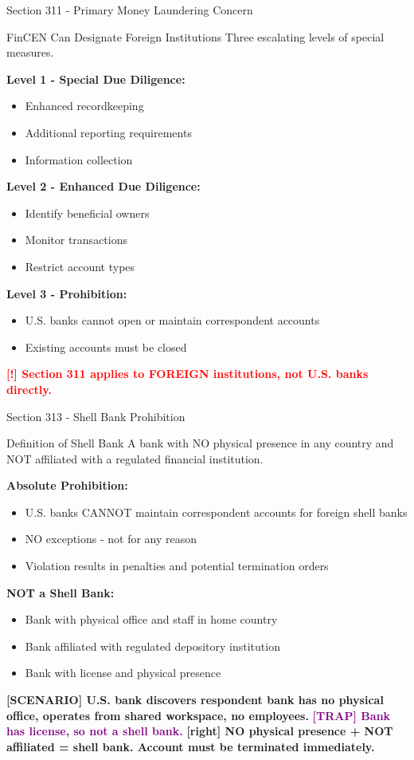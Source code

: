 \documentclass[11pt,a4paper]{beamer}
\newcommand{\redflag}[1]{\textcolor{red}{\textbf{[!] #1}}}
\newcommand{\trap}[1]{\textcolor{purple}{\textbf{[TRAP] #1}}}
\newcommand{\correct}[1]{\textcolor{green!50!black}{\textbf{[right] #1}}}
\newcommand{\scenario}[1]{\textcolor{blue!70!black}{\textbf{[SCENARIO] #1}}}
\begin{document}
\begin{frame}{Section 311 - Primary Money Laundering Concern}
\begin{block}{FinCEN Can Designate Foreign Institutions}
Three escalating levels of special measures.
\end{block}
\textbf{Level 1 - Special Due Diligence:}
\begin{itemize}
\item Enhanced recordkeeping
\item Additional reporting requirements
\item Information collection
\end{itemize}
\textbf{Level 2 - Enhanced Due Diligence:}
\begin{itemize}
\item Identify beneficial owners
\item Monitor transactions
\item Restrict account types
\end{itemize}
\textbf{Level 3 - Prohibition:}
\begin{itemize}
\item U.S. banks cannot open or maintain correspondent accounts
\item Existing accounts must be closed
\end{itemize}
\redflag{Section 311 applies to FOREIGN institutions, not U.S. banks directly.}
\end{frame}

\begin{frame}{Section 313 - Shell Bank Prohibition}
\begin{block}{Definition of Shell Bank}
A bank with NO physical presence in any country and NOT affiliated with a regulated financial institution.
\end{block}
\textbf{Absolute Prohibition:}
\begin{itemize}
\item U.S. banks CANNOT maintain correspondent accounts for foreign shell banks
\item NO exceptions - not for any reason
\item Violation results in penalties and potential termination orders
\end{itemize}
\textbf{NOT a Shell Bank:}
\begin{itemize}
\item Bank with physical office and staff in home country
\item Bank affiliated with regulated depository institution
\item Bank with license and physical presence
\end{itemize}
\scenario{U.S. bank discovers respondent bank has no physical office, operates from shared workspace, no employees.}
\trap{Bank has license, so not a shell bank.}
\correct{NO physical presence + NOT affiliated = shell bank. Account must be terminated immediately.}
\end{frame}
\end{document}
